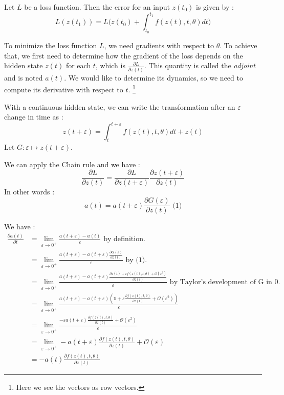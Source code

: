 \documentclass[10pt,a4paper]{article}
\theoremstyle{definition}
\theoremstyle{definition}
\theoremstyle{definition}
\begin{document}
Let $L$ be a loss function. Then the error for an input $z(t_0)$ is given by :
$$
L(z(t_1)) = L \big( z(t_0) + \int_{t_0}^{t_1} f(z(t),t,\theta) dt \big)
$$

To minimize the loss function $L$, we need gradients with respect to $\theta$. To achieve that, we first need to determine how the gradient of the loss depends on the hidden state $z(t)$ for each $t$, which is $\frac{\partial L}{\partial z(t)}$. This quantity is called the \textit{adjoint} and is noted $a(t)$. We would like to determine its dynamics, so we need to compute its derivative with respect to $t$. \footnote{Here we see the vectors as row vectors.}

With a continuous hidden state, we can write the transformation after an $\varepsilon$ change in time as :
$$
z(t+\varepsilon) = \int^{t+\varepsilon}_{t} f(z(t),t,\theta) dt + z(t)
$$
Let $ G : \varepsilon \mapsto z(t+\varepsilon)$.

We can apply the Chain rule and we have :
$$
\frac{\partial L}{\partial z(t)} = \frac{\partial L}{\partial z(t+\varepsilon)} \frac{\partial z(t+\varepsilon)}{\partial z(t)}
$$
In other words :
$$
a(t) = a(t+\varepsilon)\frac{\partial G(\varepsilon)}{\partial z(t)} \text{   (1)}
$$

We have :
\begin{align*}
\frac{\partial a(t)}{\partial t} &= \lim_{\varepsilon \rightarrow 0^+} \frac{a(t+\varepsilon) - a(t)}{\varepsilon} \text{ by definition.}\\
&= \lim_{\varepsilon \rightarrow 0^+} \frac{a(t+\varepsilon) - a(t+\varepsilon)\frac{\partial G(\varepsilon)}{\partial z(t)}}{\varepsilon} \text{ by (1).}\\
&= \lim_{\varepsilon \rightarrow 0^+} \frac{a(t+\varepsilon) - a(t+\varepsilon)\frac{\partial z(t) + \varepsilon f(z(t),t,\theta) + \mathcal{O}(\varepsilon^2)}{\partial z(t)}}{\varepsilon} \text{ by Taylor's development of G in 0.} \\
&= \lim_{\varepsilon \rightarrow 0^+} \frac{a(t+\varepsilon) - a(t+\varepsilon)(\mathbb{1} + \varepsilon \frac{\partial f(z(t),t,\theta)} {\partial z(t)}+ \mathcal{O}(\varepsilon^2))}{\varepsilon}\\
&= \lim_{\varepsilon \rightarrow 0^+} \frac{-\varepsilon a(t+\varepsilon) \frac{\partial f(z(t),t,\theta)} {\partial z(t)}+ \mathcal{O}(\varepsilon^2)}{\varepsilon}\\
&= \lim_{\varepsilon \rightarrow 0^+} - a(t+\varepsilon) \frac{\partial f(z(t),t,\theta)} {\partial z(t)}+ \mathcal{O}(\varepsilon)\\
&= -a(t)\frac{\partial f(z(t),t,\theta)} {\partial z(t)}
\end{align*}
 
\end{document}
